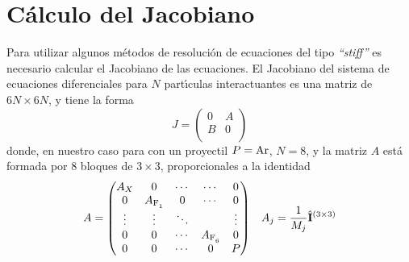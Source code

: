 \section{C\'{a}lculo del Jacobiano}
\label{S:calc-jacob}

Para utilizar algunos m\'{e}todos de resoluci\'{o}n de ecuaciones del tipo \emph{``stiff''} es necesario calcular el Jacobiano de las ecuaciones.
El Jacobiano del sistema de ecuaciones diferenciales para $N$ part\'{\i}culas interactuantes es una matriz de $6N \times 6N$, y tiene la forma
\begin{equation}
  \label{Q:Jacob-ec-dif}
  J =
  \begin{pmatrix}
    0 & A \\
    B & 0 \\
  \end{pmatrix}
\end{equation}
donde, en nuestro caso para  con un proyectil $P=\ce{Ar}$, $N=8$, y la matriz $A$ est\'{a} formada por 8 bloques de $3 \times 3$, proporcionales a la identidad
\begin{align}
  \label{Q:Jacob-ec-dif-A}
  A &=
\begin{pmatrix}
  A_{X} & 0 & \cdots &  \cdots & 0 \\
  0 & A_{\ce{F1}}& 0 & \cdots & 0 \\
  \vdots  & \vdots  & \ddots &  & \vdots  \\
  0 &  0 &\cdots &  A_{\ce{F6}} & 0 \\
  0 & 0 & \cdots & 0 & P
\end{pmatrix}    &A_{j} = \frac{1}{M_{j}} \oper{I}^{(3\times 3)}
\end{align}


